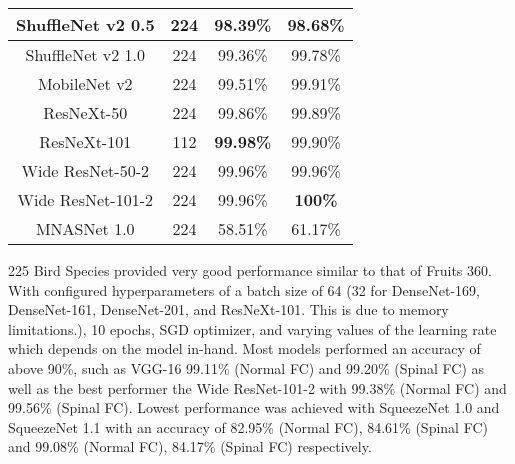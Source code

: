 \documentclass[conference]{IEEEtran}
\begin{document}
\begin{table}
\begin{tabular}{|c|c|c|c|}
    \hline ShuffleNet v2 0.5  & 224 & 98.39\%   & 98.68\% \\
    \hline ShuffleNet v2 1.0  & 224 & 99.36\%   & 99.78\% \\
    \hline MobileNet v2 & 224 & 99.51\%  & 99.91\% \\
    \hline ResNeXt-50   & 224 & 99.86\%  & 99.89\% \\
    \hline ResNeXt-101  & 112 & \textbf{99.98\%}& 99.90\% \\
    \hline Wide ResNet-50-2   & 224 & 99.96\%   & 99.96\% \\
    \hline Wide ResNet-101-2  & 224 & 99.96\%   & \textbf{100\%} \\
    \hline MNASNet 1.0        & 224 & 58.51\%   & 61.17\% \\
    \hline
\end{tabular} 
\end{table}

225 Bird Species provided very good performance similar to that of Fruits 360. With configured hyperparameters of a batch size of 64 (32 for DenseNet-169, DenseNet-161, DenseNet-201, and ResNeXt-101. This is due to memory limitations.), 10 epochs, SGD optimizer, and varying values of the learning rate which depends on the model in-hand. Most models performed an accuracy of above 90\%, such as VGG-16 99.11\% (Normal FC) and 99.20\% (Spinal FC) as well as the best performer the Wide ResNet-101-2 with 99.38\% (Normal FC) and 99.56\% (Spinal FC). Lowest performance was achieved with SqueezeNet 1.0 and SqueezeNet 1.1 with an accuracy of 82.95\% (Normal FC), 84.61\% (Spinal FC) and 99.08\% (Normal FC), 84.17\% (Spinal FC) respectively. 
\end{document}
